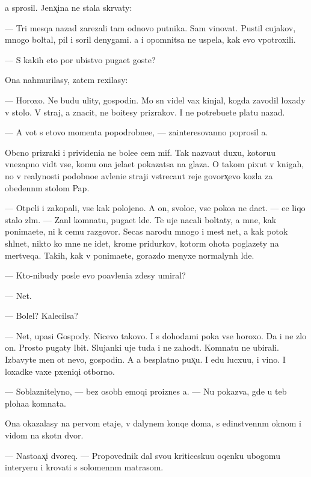 \documentclass[10pt]{book}
\begin{document}
{\Y}a sprosil. Jenx̨ina ne stala skr{\yi}vaty:

— Tri mes{\ia}qa nazad zarezali tam odnovo putnika. Sam vinovat. Pustil cujakov, mnogo boltal, pil i soril denygami. {\Y}a i opomnitsa ne uspela, kak {\y}evo v{\yi}potroxili.

— S kakih eto por ubi{\y}stvo puga{\y}et goste{\y}?

Ona nahmurilasy, zatem rexilasy:

— Horoxo. Ne budu {\y}ulity, gospodin. Mo{\y} s{\yi}n videl vax kinjal, kogda zavodil loxady v sto{\y}lo. V{\yi} straj, a znacit, ne bo{\y}itesy prizrakov. I ne potrebu{\y}ete platu nazad.

— A vot s etovo momenta popodrobne{\y}e, — za{\y}interesovanno poprosil {\y}a.

Ob{\yi}cno prizraki i privideni{\y}a ne bole{\y}e cem mif. Tak naz{\yi}va{\y}ut duxu, kotoru{\y}u vnezapno vid{\ia}t vse, komu ona jela{\y}et pokazatsa na glaza. O takom pixut v knigah, no v realynosti podobno{\y}e {\y}avleni{\y}e straji vstreca{\y}ut reje govor{\ia}x̨evo kozla za obedenn{\yi}m stolom Pap{\yi}.

— Otpeli i zakopali, vse kak polojeno. A on, svoloc, vse poko{\y}a ne da{\y}et. — {\Y}ee liqo stalo zl{\yi}m. — Zan{\ia}l komnatu, puga{\y}et l{\iu}de{\y}. Te uje nacali boltaty, a mne, kak ponima{\y}ete, ni k cemu razgovor{\yi}. Se{\y}cas narodu mnogo i mest net, a kak potok shl{\yi}net, nikto ko mne ne idet, krome pridurkov, kotor{\yi}m ohota poglazety na mertveqa. Takih, kak v{\yi} ponima{\y}ete, gorazdo menyxe normalyn{\yi}h l{\iu}de{\y}.

— Kto-nibudy posle {\y}evo po{\y}avleni{\y}a zdesy umiral?

— Net.

— Bolel? Kalecilsa?

— Net, upasi Gospody. Nicevo takovo. I s dohodami poka vse horoxo. Da i ne zlo{\y} on. Prosto pugaty l{\iu}bit. Slujanki uje tuda i ne zahod{\ia}t. Komnatu ne ubirali. Izbavyte men{\ia} ot nevo, gospodin. A {\y}a besplatno pux̨u. I {\y}edu lucxu{\y}u, i vino. I loxadke vaxe{\y} pxeniqi otborno{\y}.

— Soblaznitelyno, — bez osob{\yi}h emoqi{\y} pro{\y}iznes {\y}a. — Nu pokaz{\yi}va{\y}, gde u teb{\ia} ploha{\y}a komnata.

Ona okazalasy na pervom etaje, v dalynem konqe doma, s {\y}edinstvenn{\yi}m oknom i vidom na skotn{\yi}{\y} dvor.

— Nasto{\y}ax̨i{\y} dvoreq. — Propovednik dal svo{\y}u kriticesku{\y}u oqenku ubogomu interyeru i krovati s solomenn{\yi}m matrasom.
\end{document}
